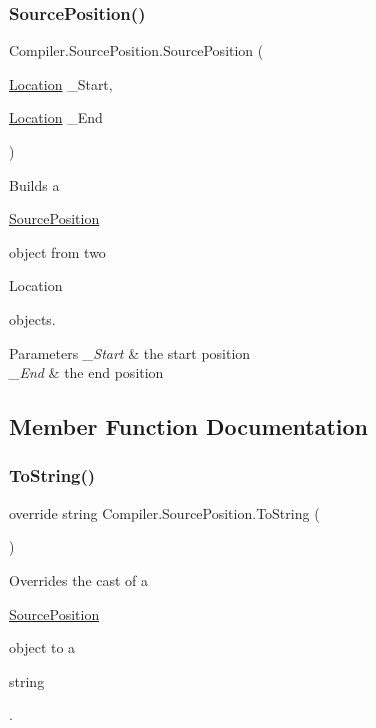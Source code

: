 \subsubsection{\texorpdfstring{Source\+Position()}{SourcePosition()}}
{\footnotesize\ttfamily Compiler.\+Source\+Position.\+Source\+Position (\begin{DoxyParamCaption}\item[{\mbox{\hyperlink{class_compiler_1_1_location}{Location}}}]{\+\_\+\+Start,  }\item[{\mbox{\hyperlink{class_compiler_1_1_location}{Location}}}]{\+\_\+\+End }\end{DoxyParamCaption})}

Builds a
\begin{DoxyCode}
\mbox{\hyperlink{class_compiler_1_1_source_position_ac8eeb6d20c8a788dfe27345b435bb035}{SourcePosition}} 
\end{DoxyCode}
 object from two
\begin{DoxyCode}
Location 
\end{DoxyCode}
 objects. 
\begin{DoxyParams}{Parameters}
{\em \+\_\+\+Start} & the start position \\
\hline
{\em \+\_\+\+End} & the end position \\
\hline
\end{DoxyParams}


\subsection{Member Function Documentation}
\mbox{\label{class_compiler_1_1_source_position_a95b14602e2629b906f29ef194d4f88f6}} 
\subsubsection{\texorpdfstring{To\+String()}{ToString()}}
{\footnotesize\ttfamily override string Compiler.\+Source\+Position.\+To\+String (\begin{DoxyParamCaption}{ }\end{DoxyParamCaption})}

Overrides the cast of a
\begin{DoxyCode}
\mbox{\hyperlink{class_compiler_1_1_source_position_ac8eeb6d20c8a788dfe27345b435bb035}{SourcePosition}} 
\end{DoxyCode}
 object to a
\begin{DoxyCode}
\textcolor{keywordtype}{string} 
\end{DoxyCode}
 . 

